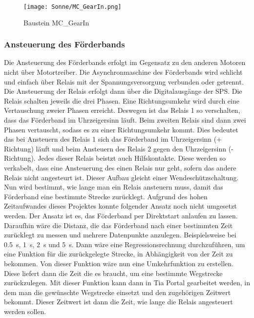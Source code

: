 \begin{figure}[h]
    \centering
    \texttt{[image: Sonne/MC\_GearIn.png]}    
    \caption{Baustein MC\_GearIn}
    \label{MC_GearIn}
\end{figure}

\subsubsection{Ansteuerung des Förderbands}
\label{Ansteuerung des Förderbandes}
Die Ansteuerung des Förderbands erfolgt im Gegensatz zu den anderen Motoren nicht über Motortreiber. Die Asynchronmaschine des Förderbands wird schlicht und einfach über Relais mit der Spannungsversorgung verbunden oder getrennt. Die Ansteuerung der Relais erfolgt dann über die Digitalausgänge der SPS. Die Relais schalten jeweils die drei Phasen. Eine Richtungsumkehr wird durch eine Vertauschung zweier Phasen erreicht. Deswegen ist das Relais 1 so verschalten, dass das Förderband im Uhrzeigersinn läuft. Beim zweiten Relais sind dann zwei Phasen vertauscht, sodass es zu einer Richtungsumkehr kommt. Dies bedeutet das bei Ansteuern des Relais 1 sich das Förderband im Uhrzeigersinn (+ Richtung) läuft und beim Ansteuern des  Relais 2 gegen den Uhrzeigersinn (- Richtung). Jedes dieser Relais beistzt auch Hilfskontakte. Diese werden so verkabelt, dass eine Ansteuerung des einen Relais nur geht, sofern das andere Relais nicht angesteurt ist. Dieser Aufbau gleicht einer Wendeschützschaltung. \\
Nun wird bestimmt, wie lange man ein Relais ansteuern muss, damit das Förderband eine bestimmte Strecke zurücklegt. Aufgrund des hohen Zeitaufwandes dieses Projektes konnte folgender Ansatz noch nicht umgesetzt werden. Der Ansatz ist es, das Förderband per Direktstart anlaufen zu lassen. Daraufhin wäre die Distanz, die das Förderband nach einer bestimmten Zeit zurücklegt zu messen und mehrere Datenpunkte anzulegen. Beispielsweise bei \qty{0.5}{\second}, \qty{1}{\second}, \qty{2}{\second} und \qty{5}{\second}. Dann wäre eine Regressionsrechnung durchzuführen, um eine Funktion für die zurückgelegte Strecke, in Abhängigkeit von der Zeit zu bekommen. Von dieser Funktion wäre nun eine Umkehrfunktion zu erstellen. Diese liefert dann die Zeit die es braucht, um eine bestimmte Wegstrecke zurückzulegen. Mit dieser Funktion kann dann in Tia Portal gearbeitet werden, in dem man die gewünschte Wegstrecke einsetzt und den zugehörigen Zeitwert bekommt. Dieser Zeitwert ist dann die Zeit, wie lange die Relais angesteuert werden sollen. 

